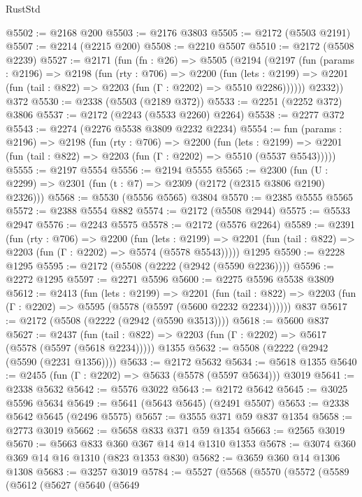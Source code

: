 \begin{lexlean}{RustStd}
\begin{coremodule}
@5502 := @2168 @200
@5503 := @2176 @3803
@5505 := @2172 (@5503 @2191)
@5507 := @2214 (@2215 @200)
@5508 := @2210 @5507
@5510 := @2172 (@5508 @2239)
@5527 := @2171
    (fun (fn : @26) =>
    @5505
      (@2194
        (@2197
          (fun (params : @2196) =>
          @2198
            (fun (rty : @706) =>
            @2200
              (fun (lets : @2199) =>
              @2201 (fun (tail : @822) => @2203 (fun (Γ : @2202) => @5510 @2286))))))
        @2332))
    @372
@5530 := @2338 (@5503 (@2189 @372))
@5533 := @2251 (@2252 @372) @3806
@5537 := @2172 (@2243 (@5533 @2260) @2264)
@5538 := @2277 @372
@5543 := @2274 (@2276 @5538 @3809 @2232 @2234)
@5554 := fun (params : @2196) =>
  @2198
    (fun (rty : @706) =>
    @2200
      (fun (lets : @2199) =>
      @2201 (fun (tail : @822) => @2203 (fun (Γ : @2202) => @5510 (@5537 @5543)))))
@5555 := @2197 @5554
@5556 := @2194 @5555
@5565 := @2300 (fun (U : @2299) => @2301 (fun (t : @7) => @2309 (@2172 (@2315 @3806 @2190) @2326)))
@5568 := @5530 (@5556 @5565) @3804
@5570 := @2385 @5555 @5565
@5572 := @2388 @5554 @882
@5574 := @2172 (@5508 @2944)
@5575 := @5533 @2947
@5576 := @2243 @5575
@5578 := @2172 (@5576 @2264)
@5589 := @2391
    (fun (rty : @706) =>
    @2200
      (fun (lets : @2199) =>
      @2201 (fun (tail : @822) => @2203 (fun (Γ : @2202) => @5574 (@5578 @5543)))))
    @1295
@5590 := @2228 @1295
@5595 := @2172 (@5508 (@2222 (@2942 (@5590 @2236))))
@5596 := @2272 @1295
@5597 := @2271 @5596
@5600 := @2275 @5596 @5538 @3809
@5612 := @2413
    (fun (lets : @2199) =>
    @2201
      (fun (tail : @822) => @2203 (fun (Γ : @2202) => @5595 (@5578 (@5597 (@5600 @2232 @2234))))))
    @837
@5617 := @2172 (@5508 (@2222 (@2942 (@5590 @3513))))
@5618 := @5600 @837
@5627 := @2437
    (fun (tail : @822) => @2203 (fun (Γ : @2202) => @5617 (@5578 (@5597 (@5618 @2234)))))
    @1355
@5632 := @5508 (@2222 (@2942 (@5590 (@2231 @1356))))
@5633 := @2172 @5632
@5634 := @5618 @1355
@5640 := @2455 (fun (Γ : @2202) => @5633 (@5578 (@5597 @5634))) @3019
@5641 := @2338 @5632
@5642 := @5576 @3022
@5643 := @2172 @5642
@5645 := @3025 @5596 @5634
@5649 := @5641 (@5643 @5645) (@2491 @5507)
@5653 := @2338 @5642 @5645 (@2496 @5575)
@5657 := @3555 @371 @59 @837 @1354
@5658 := @2773 @3019
@5662 := @5658 @833 @371 @59 @1354
@5663 := @2565 @3019
@5670 := @5663 @833 @360 @367 @14 @14 @1310 @1353
@5678 := @3074 @360 @369 @14 @16 @1310 (@823 @1353 @830)
@5682 := @3659 @360 @14 @1306 @1308
@5683 := @3257 @3019
@5784 := @5527
    (@5568
      (@5570
        (@5572
          (@5589
            (@5612
              (@5627
                (@5640
                  (@5649

\end{coremodule}
\end{lexlean}
